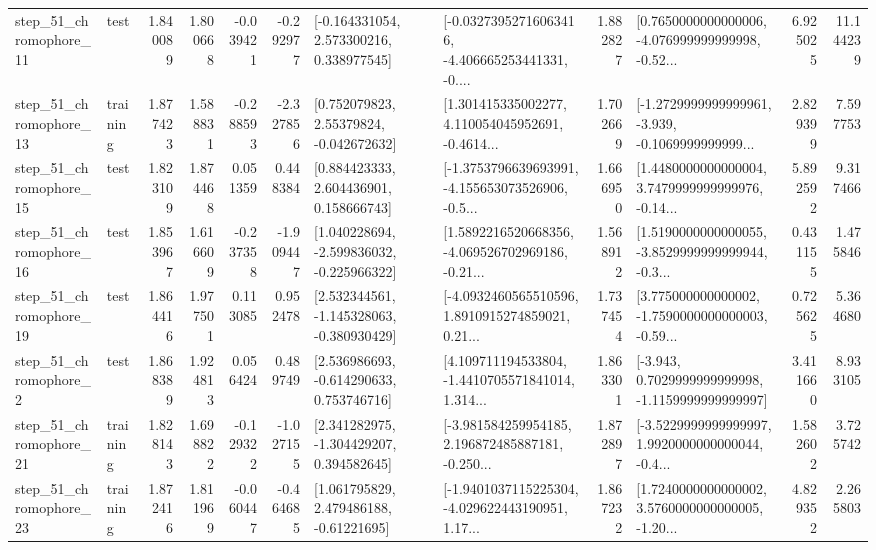 \begin{tabular}{llrrrrllrlrr}
   step\_51\_chromophore\_11 &      test &      1.840089 &    1.800668 &     -0.039421 & -0.292977 &    [-0.164331054, 2.573300216, 0.338977545] &  [-0.03273952716063416, -4.406665253441331, -0.... &       1.882827 &  [0.7650000000000006, -4.076999999999998, -0.52... &            6.925025 &         11.144239 \\
   step\_51\_chromophore\_13 &  training &      1.877423 &    1.588831 &     -0.288593 & -2.327856 &     [0.752079823, 2.55379824, -0.042672632] &  [1.301415335002277, 4.110054045952691, -0.4614... &       1.702669 &  [-1.2729999999999961, -3.939, -0.1069999999999... &            2.829399 &          7.597753 \\
   step\_51\_chromophore\_15 &      test &      1.823109 &    1.874468 &      0.051359 &  0.448384 &     [0.884423333, 2.604436901, 0.158666743] &  [-1.3753796639693991, -4.155653073526906, -0.5... &       1.666950 &  [1.4480000000000004, 3.7479999999999976, -0.14... &            5.892592 &          9.317466 \\
   step\_51\_chromophore\_16 &      test &      1.853967 &    1.616609 &     -0.237358 & -1.909447 &   [1.040228694, -2.599836032, -0.225966322] &  [1.5892216520668356, -4.069526702969186, -0.21... &       1.568912 &  [1.5190000000000055, -3.8529999999999944, -0.3... &            0.431155 &          1.475846 \\
   step\_51\_chromophore\_19 &      test &      1.864416 &    1.977501 &      0.113085 &  0.952478 &   [2.532344561, -1.145328063, -0.380930429] &  [-4.0932460565510596, 1.8910915274859021, 0.21... &       1.737454 &  [3.775000000000002, -1.7590000000000003, -0.59... &            0.725625 &          5.364680 \\
    step\_51\_chromophore\_2 &      test &      1.868389 &    1.924813 &      0.056424 &  0.489749 &    [2.536986693, -0.614290633, 0.753746716] &  [4.109711194533804, -1.4410705571841014, 1.314... &       1.863301 &  [-3.943, 0.7029999999999998, -1.1159999999999997] &            3.411660 &          8.933105 \\
   step\_51\_chromophore\_21 &  training &      1.828143 &    1.698822 &     -0.129322 & -1.027155 &    [2.341282975, -1.304429207, 0.394582645] &  [-3.981584259954185, 2.196872485887181, -0.250... &       1.872897 &  [-3.5229999999999997, 1.9920000000000044, -0.4... &            1.582602 &          3.725742 \\
   step\_51\_chromophore\_23 &  training &      1.872416 &    1.811969 &     -0.060447 & -0.464685 &     [1.061795829, 2.479486188, -0.61221695] &  [-1.9401037115225304, -4.029622443190951, 1.17... &       1.867232 &  [1.7240000000000002, 3.5760000000000005, -1.20... &            4.829352 &          2.265803 \\

\end{tabular}
